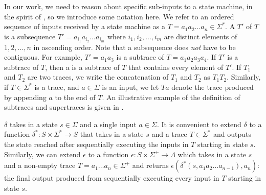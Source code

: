 In our work, we need to reason about specific sub-inputs to a state machine, in
the spirit of \whyprovenance{}, so we introduce some notation here. We refer to
an ordered sequence of inputs received by a state machine as a 
$T = a_1 a_2 \ldots a_n \in \Sigma^*$. A  $T'$ of $T$ is a
subsequence $T' = a_{i_1} a_{i_2} \ldots a_{i_m}$ where $i_1, i_2, \ldots, i_m$
are distinct elements of $1, 2, \ldots, n$ in ascending order. Note that a
subsequence does \emph{not} have to be contiguous. For example, $T' = a_1 a_3$
is a subtrace of $T = a_1 a_2 a_3 a_4$. If $T'$ is a subtrace of $T$, then a
 is a subtrace of $T$ that contains every
element of $T'$. If $T_1$ and $T_2$ are two traces, we write the concatenation
of $T_1$ and $T_2$ as $T_1T_2$. Similarly, if $T \in \Sigma^*$ is a trace, and
$a \in \Sigma$ is an input, we let $Ta$ denote the trace produced by appending
$a$ to the end of $T$. An illustrative example of the definition of subtraces
and supertraces is given in .

{}

$\delta$ takes in a state $s \in \Sigma$ and a single input $a \in \Sigma$.
It is convenient to extend $\delta$ to a function $\delta^*: S \times \Sigma^*
\to S$ that takes in a state $s$ and a trace $T \in \Sigma^*$ and outputs the
state reached after sequentially executing the inputs in $T$ starting in state
$s$. Similarly, we can extend $\epsilon$ to a function $\epsilon: S \times
\Sigma^+ \to \Lambda$ which takes in a state $s$ and a non-empty trace $T = a_1
\ldots a_n \in \Sigma^+$ and returns $\epsilon(\delta^*(s, a_1 a_2 \ldots
a_{n-1}), a_n)$: the final output produced from sequentially executing every
input in $T$ starting in state $s$.
